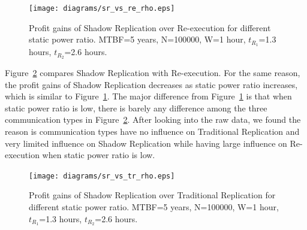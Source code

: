\begin{figure}[!h]	
	\begin{center}
			\texttt{[image: diagrams/sr\_vs\_re\_rho.eps]}
	\end{center}
	\caption{Profit gains of Shadow Replication over Re-execution for different static power ratio. MTBF=5 years, N=100000, W=1 hour, $t_{R_1}$=1.3 hours, $t_{R_2}$=2.6 hours.}
	\label{fig:sr_vs_re_rho}
\end{figure}

Figure~\ref{fig:sr_vs_tr_rho} compares Shadow Replication with Re-execution. For the same reason, the profit gains of Shadow Replication decreases as static power ratio increases, which is similar to Figure~\ref{fig:sr_vs_re_rho}. The major difference from Figure~\ref{fig:sr_vs_re_rho} is that when static power ratio is low, there is barely any difference among the three communication types in Figure~\ref{fig:sr_vs_tr_rho}. After looking into the raw data, we found the reason is communication types have no influence on Traditional Replication and very limited influence on Shadow Replication while having large influence on Re-execution when static power ratio is low.
\begin{figure}[!h]	
	\begin{center}
			\texttt{[image: diagrams/sr\_vs\_tr\_rho.eps]}
	\end{center}
	\caption{Profit gains of Shadow Replication over Traditional Replication for different static power ratio. MTBF=5 years, N=100000, W=1 hour, $t_{R_1}$=1.3 hours, $t_{R_2}$=2.6 hours.}
	\label{fig:sr_vs_tr_rho}
\end{figure}





